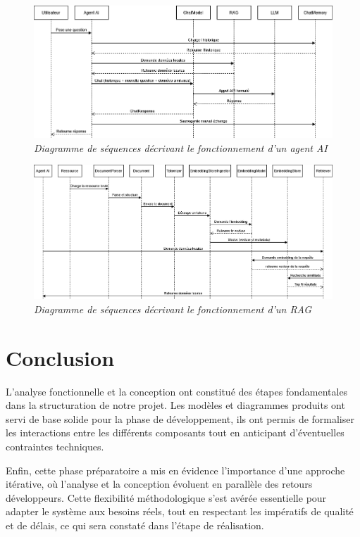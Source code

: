 \documentclass[12pt,a4paper]{report}
\begin{document}
	\begin{figure}[H]
		\centering
		\includegraphics[width=1\textwidth]{ds-ai-agent.drawio.png}
		\caption{\textit{Diagramme de séquences décrivant le fonctionnement d'un agent AI}}
		\label{fig:ds-ai-agent}
	\end{figure}
	
	\begin{figure}[H]
		\centering
		\includegraphics[width=1\textwidth]{ds-rag.drawio.png}
		\caption{\textit{Diagramme de séquences décrivant le fonctionnement d'un RAG}}
		\label{fig:ds-rag.drawio}
	\end{figure}
	
	\section{Conclusion}
	
	L’analyse fonctionnelle et la conception ont constitué des étapes fondamentales dans la structuration de notre projet. Les modèles et diagrammes produits ont servi de base solide pour la phase de développement, ils ont permis de formaliser les interactions entre les différents composants tout en anticipant d’éventuelles contraintes techniques.
	
	Enfin, cette phase préparatoire a mis en évidence l’importance d’une approche itérative, où l’analyse et la conception évoluent en parallèle des retours développeurs. Cette flexibilité méthodologique s’est avérée essentielle pour adapter le système aux besoins réels, tout en respectant les impératifs de qualité et de délais, ce qui sera constaté dans l'étape de réalisation.
	
\end{document}
